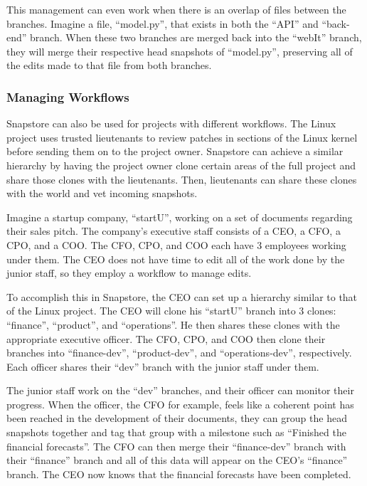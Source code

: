 This management can even work when there is an overlap of files between the branches. Imagine a file, ``model.py'', that exists in both the ``API'' and ``back-end'' branch. When these two branches are merged back into the ``webIt'' branch, they will merge their respective head snapshots of ``model.py'', preserving all of the edits made to that file from both branches.

\subsubsection{Managing Workflows}

Snapstore can also be used for projects with different workflows. The Linux project uses trusted lieutenants \cite{linux} to review patches in sections of the Linux kernel before sending them on to the project owner. Snapstore can achieve a similar hierarchy by having the project owner clone certain areas of the full project and share those clones with the lieutenants. Then, lieutenants can share these clones with the world and vet incoming snapshots.

Imagine a startup company, ``startU'', working on a set of documents regarding their sales pitch. The company's executive staff consists of a CEO, a CFO, a CPO, and a COO. The CFO, CPO, and COO each have 3 employees working under them. The CEO does not have time to edit all of the work done by the junior staff, so they employ a workflow to manage edits.

To accomplish this in Snapstore, the CEO can set up a hierarchy similar to that of the Linux project. The CEO will clone his ``startU'' branch into 3 clones: ``finance'', ``product'', and ``operations''. He then shares these clones with the appropriate executive officer. The CFO, CPO, and COO then clone their branches into ``finance-dev'', ``product-dev'', and ``operations-dev'', respectively. Each officer shares their ``dev'' branch with the junior staff under them.

The junior staff work on the ``dev'' branches, and their officer can monitor their progress. When the officer, the CFO for example, feels like a coherent point has been reached in the development of their documents, they can group the head snapshots together and tag that group with a milestone such as ``Finished the financial forecasts''. The CFO can then merge their ``finance-dev'' branch with their ``finance'' branch and all of this data will appear on the CEO's ``finance'' branch. The CEO now knows that the financial forecasts have been completed.





